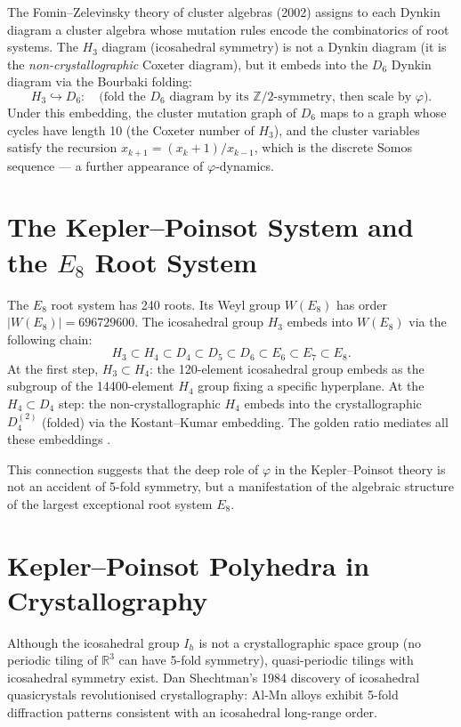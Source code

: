 The Fomin–Zelevinsky theory of cluster algebras (2002) assigns
to each Dynkin diagram a cluster algebra whose mutation rules
encode the combinatorics of root systems.  The $H_3$ diagram
(icosahedral symmetry) is not a Dynkin diagram (it is the
\emph{non-crystallographic} Coxeter diagram), but it embeds
into the $D_6$ Dynkin diagram via the Bourbaki folding:
\[
  H_3 \hookrightarrow D_6:\quad \text{(fold the } D_6 \text{ diagram by its }
  \mathbb{Z}/2 \text{-symmetry, then scale by }\varphi).
\]
Under this embedding, the cluster mutation graph of $D_6$ maps
to a graph whose cycles have length 10 (the Coxeter number of
$H_3$), and the cluster variables satisfy the recursion
$x_{k+1} = (x_k + 1)/x_{k-1}$, which is the discrete
Somos sequence — a further appearance of $\varphi$-dynamics.

\section{The Kepler--Poinsot System and the \texorpdfstring{$E_8$}{E8} Root System}
\label{sec:e8-connection}

The $E_8$ root system has 240 roots.  Its Weyl group $W(E_8)$
has order $|W(E_8)| = 696729600$.  The icosahedral group
$H_3$ embeds into $W(E_8)$ via the following chain:
\[
  H_3 \subset H_4 \subset D_4 \subset D_5 \subset D_6
  \subset E_6 \subset E_7 \subset E_8.
\]
At the first step, $H_3 \subset H_4$: the 120-element
icosahedral group embeds as the subgroup of the 14400-element
$H_4$ group fixing a specific hyperplane.  At the $H_4 \subset
D_4$ step: the non-crystallographic $H_4$ embeds into the
crystallographic $D_4^{(2)}$ (folded) via the
Kostant–Kumar embedding.  The golden ratio mediates all these
embeddings \cite{coxeter_regular_polytopes}.

This connection suggests that the deep role of $\varphi$ in
the Kepler–Poinsot theory is not an accident of
5-fold symmetry, but a manifestation of the algebraic
structure of the largest exceptional root system $E_8$.

\section{Kepler--Poinsot Polyhedra in Crystallography}
\label{sec:crystallography}

Although the icosahedral group $I_h$ is not a crystallographic
space group (no periodic tiling of $\mathbb{R}^3$ can have
5-fold symmetry), quasi-periodic tilings with icosahedral
symmetry exist.  Dan Shechtman's 1984 discovery of icosahedral
quasicrystals \cite{cromwell_polyhedra} revolutionised crystallography:
Al-Mn alloys exhibit 5-fold diffraction patterns consistent
with an icosahedral long-range order.

